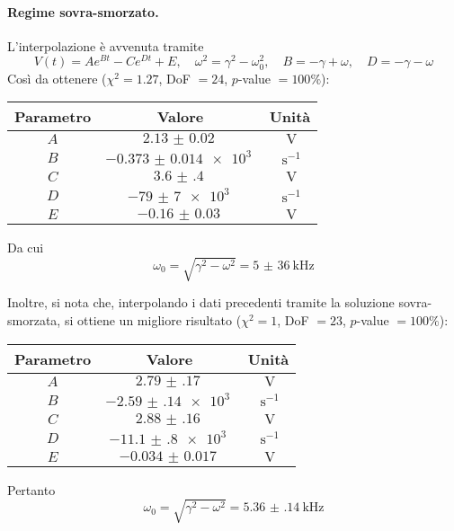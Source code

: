 \documentclass[a4paper]{article}
\begin{document}
\paragraph{Regime sovra-smorzato.}
L'interpolazione è avvenuta tramite
\[
V(t)=Ae^{B t}-Ce^{D t}+E,\quad \omega^2=\gamma^2-\omega_0^2,\quad B=-\gamma+\omega,\quad D=-\gamma-\omega
\] 
Così da ottenere ($\chi^2= 1.27$, DoF $=24$, $p$-value $=100\%$):
\begin{center}
\begin{tabular}[t]{c|c|c}
	Parametro & Valore & Unità \\\midrule
	$A$ & $\SI{2.13(2)}{}$ & $\SI{}{\V}$\\
	$B$ & $\SI{-0.373(14)e+3}{}$ & $\SI{}{\s^{-1}}$\\
	$C$ & $\SI{3.6(4)}{}$ & $\SI{}{\V}$\\
	$D$ & $\SI{-79(7)e+3}{}$ & $\SI{}{\s^{-1}}$\\
	$E$ & $\SI{-0.16(3)}{}$ & $\SI{}{\V}$\\
\end{tabular}
\end{center}
Da cui
\[
\omega_0=\sqrt{\gamma^2-\omega^2} = \SI{5(36)}{\kHz}
\] 

Inoltre, si nota che, interpolando i dati precedenti tramite la soluzione sovra-smorzata, si ottiene un migliore risultato ($\chi^2=1$, DoF $=23$, $p$-value $=100\%$):
\begin{center}
\begin{tabular}[t]{c|c|c}
	Parametro & Valore & Unità \\\midrule
	$A$ & $\SI{2.79(17)}{}$ & $\SI{}{\V}$\\
	$B$ & $\SI{-2.59(14)e+3}{}$ & $\SI{}{\s^{-1}}$\\
	$C$ & $\SI{2.88(16)}{}$ & $\SI{}{\V}$\\
	$D$ & $\SI{-11.1(8)e+3}{}$ & $\SI{}{\s^{-1}}$\\
	$E$ & $\SI{-0.034(17)}{}$ & $\SI{}{\V}$\\
\end{tabular}
\end{center}
Pertanto
\[
\omega_0=\sqrt{\gamma^2-\omega^2} =\SI{5.36(14)}{\kHz}
\] 
\end{document}
